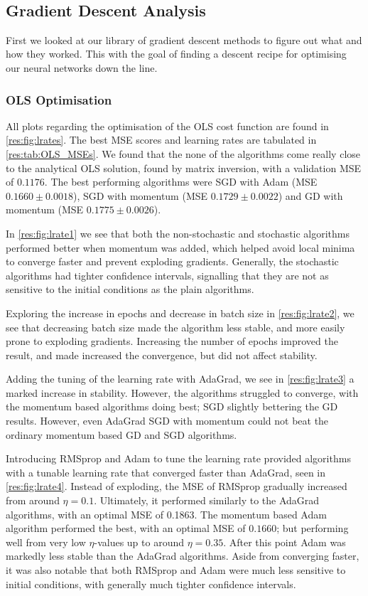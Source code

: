 \\

\subsection{Gradient Descent Analysis}
    First we looked at our library of gradient descent methods to figure out what and how they worked. This with the goal of finding a descent recipe for optimising our neural networks down the line.
    
    \subsubsection{OLS Optimisation}
        All plots regarding the optimisation of the OLS cost function are found in \cref{res:fig:lrates}. The best MSE scores and learning rates are tabulated in \cref{res:tab:OLS_MSEs}. We found that the none of the algorithms come really close to the analytical OLS solution, found by matrix inversion, with a validation MSE of $0.1176$. The best performing algorithms were SGD with Adam (MSE $0.1660 \pm 0.0018$), SGD with momentum (MSE $0.1729 \pm 0.0022$) and GD with momentum (MSE $0.1775 \pm 0.0026$).

        In \cref{res:fig:lrate1} we see that both the non-stochastic and stochastic algorithms performed better when momentum was added, which helped avoid local minima to converge faster and prevent exploding gradients. Generally, the stochastic algorithms had tighter confidence intervals, signalling that they are not as sensitive to the initial conditions as the plain algorithms.

        Exploring the increase in epochs and decrease in batch size in \cref{res:fig:lrate2}, we see that decreasing batch size made the algorithm less stable, and more easily prone to exploding gradients. Increasing the number of epochs improved the result, and made increased the convergence, but did not affect stability.

        Adding the tuning of the learning rate with AdaGrad, we see in \cref{res:fig:lrate3} a marked increase in stability. However, the algorithms struggled to converge, with the momentum based algorithms doing best; SGD slightly bettering the GD results. However, even AdaGrad SGD with momentum could not beat the ordinary momentum based GD and SGD algorithms.

        Introducing RMSprop and Adam to tune the learning rate provided algorithms with a tunable learning rate that converged faster than AdaGrad, seen in \cref{res:fig:lrate4}. Instead of exploding, the MSE of RMSprop gradually increased from around $\eta=0.1$. Ultimately, it performed similarly to the AdaGrad algorithms, with an optimal MSE of 0.1863. The momentum based Adam algorithm performed the best, with an optimal MSE of $0.1660$; but performing well from very low $\eta$-values up to around $\eta=0.35$. After this point Adam was markedly less stable than the AdaGrad algorithms. Aside from converging faster, it was also notable that both RMSprop and Adam were much less sensitive to initial conditions, with generally much tighter confidence intervals.

